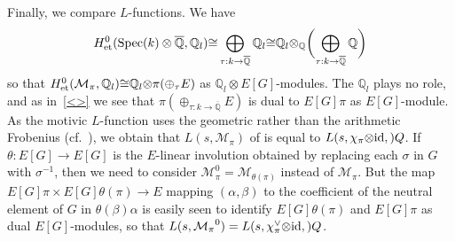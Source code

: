 \documentclass{amsart}
\begin{document}
\begin{remark}
Finally, we compare {$L$-functions{\futurelet{}}}.  We have 
\begin{equation*}
 H_{\textup{et}}^0({\operatorname{Spec}}(k) \otimes {\overline{\mathbb Q}},{\mathbb Q}_l) {\cong} \bigoplus_{{\tau}:k\to{\overline{\mathbb Q}}} {\mathbb Q}_l
{\cong} {\mathbb Q}_l {\otimes}_{\mathbb Q} \biggl( \bigoplus_{{\tau}:k\to{\overline{\mathbb Q}}} {\mathbb Q} \biggr)
\end{equation*}
so that 
$H_{\textup{et}}^0({\mathcal{M}_\pi},{\mathbb Q}_l) {\cong} {\mathbb Q}_l {\otimes} \pi (\oplus_{\tau} E)  $ as $ {\mathbb Q}_l{\otimes} E[G] $-modules.
The $ {\mathbb Q}_l $ plays no role, and as in~\eqref{<>} we see that
$ \pi(\oplus_{{\tau}:k\to{\overline{\mathbb Q}}} E ) $ is dual to $ E[G] \pi $ as $ E[G] $-module.
As the motivic {$L$-function{\futurelet{}}} uses
the geometric rather than the arithmetic Frobenius (cf.~\cite[p.26]{Kat94}),
we obtain that $ L(s,{\mathcal{M}_\pi}) $ of \cite[\S~3]{bei85} is equal to $ {L(s,{\chi_\pi{\otimes}{\textup{id}}},{\mathbb)}Q} $.
If $ \theta : E[G] \to E[G] $ is the $ E $-linear involution obtained by replacing each $ {\sigma} $ in $ G $ with $ {\sigma}^{-1} $,
then we need to consider $ \mathcal{M}_{\pi}^0 = \mathcal{M}_{\theta(\pi)} $ instead of $ {\mathcal{M}_\pi} $.
But the map $ E[G]\pi \times E[G]\theta(\pi) \to E $ mapping $ ({\alpha},{\beta}) $ to the coefficient of the neutral
element of $ G $
in $ \theta({\beta}){\alpha} $
is easily seen to identify $ E[G]\theta(\pi) $ and $ E[G]\pi $ as dual $ E[G] $-modules, so that
$ L(s,{\mathcal{M}_\pi}^0) = {L(s,{\chi_\pi^\vee{\otimes}{\textup{id}}},{\mathbb)}Q} $.
\end{remark}
\end{document}
